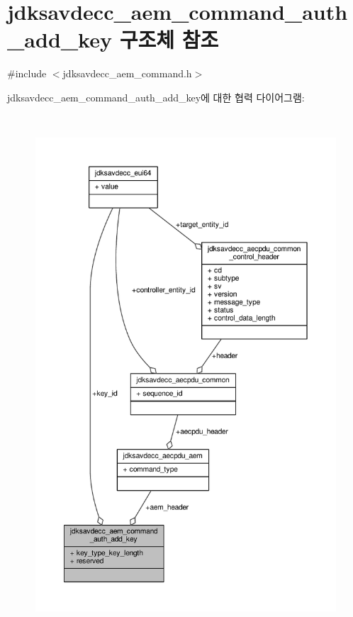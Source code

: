 \hypertarget{structjdksavdecc__aem__command__auth__add__key}{}\section{jdksavdecc\+\_\+aem\+\_\+command\+\_\+auth\+\_\+add\+\_\+key 구조체 참조}
\label{structjdksavdecc__aem__command__auth__add__key}


{\ttfamily \#include $<$jdksavdecc\+\_\+aem\+\_\+command.\+h$>$}



jdksavdecc\+\_\+aem\+\_\+command\+\_\+auth\+\_\+add\+\_\+key에 대한 협력 다이어그램\+:
\nopagebreak
\begin{figure}[H]
\begin{center}
\leavevmode
\includegraphics[height=550pt]{structjdksavdecc__aem__command__auth__add__key__coll__graph}
\end{center}
\end{figure}
